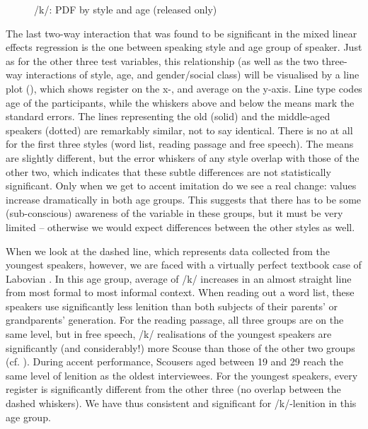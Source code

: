 \begin{figure}
	
		\resizebox{0.5\linewidth}{!}{} 
	\caption{/k/: PDF by style and age (released only)}
	\label{fig.line.k.tot}
\end{figure}

The last two-way interaction that was found to be significant in the mixed linear effects regression is the one between speaking style and age group of speaker.
Just as for the other three test variables, this relationship (as well as the two three-way interactions of style, age, and gender/social class) will be visualised by a line plot (), which shows register on the x-, and average  on the y-axis.
Line type codes age of the participants, while the whiskers above and below the means mark the standard errors.
The lines representing the old (solid) and the middle-aged speakers (dotted) are remarkably similar, not to say identical.
There is no  at all for the first three styles (word list, reading passage and free speech).
The means are slightly different, but the error whiskers of any style overlap with those of the other two, which indicates that these subtle differences are not statistically significant.
Only when we get to accent imitation do we see a real change:  values increase dramatically in both age groups.
This suggests that there has to be some (sub-conscious) awareness of the variable in these groups, but it must be very limited -- otherwise we would expect differences between the other styles as well.

When we look at the dashed line, which represents data collected from the youngest speakers, however, we are faced with a virtually perfect textbook case of Labovian .
In this age group, average  of /k/ increases in an almost straight line from most formal to most informal context.
When reading out a word list, these speakers use significantly less lenition than both subjects of their parents' or grandparents' generation.
For the reading passage, all three groups are on the same level, but in free speech, /k/ realisations of the youngest speakers are significantly (and considerably!) more Scouse than those of the other two groups (cf. ).
During accent performance, Scousers aged between 19 and 29 reach the same level of lenition as the oldest interviewees.
For the youngest speakers, every register is significantly different from the other three (no overlap between the dashed whiskers).
We have thus consistent and significant  for /k/-lenition in this age group.

